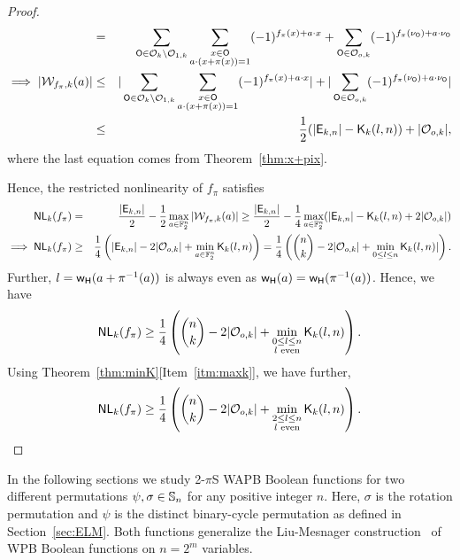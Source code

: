 \documentclass{llncs}
\begin{document}
\begin{proof}
\begin{eqnarray*}
& =  & \sum_{\mathsf{O} \in \mathcal{O}_k\setminus \mathcal{O}_{1,k}} \sum_{\substack{x \in \mathsf{O} \\ a \cdot (x + \pi(x))= 1}} (-1)^{f_\pi(x)+ a \cdot x} + \sum_{\mathsf{O} \in \mathcal{O}_{o,k}} (-1)^{ f_\pi(\nu_{\mathsf{O}}) + a \cdot \nu_{\mathsf{O}}}\nonumber \\
\implies |\mathcal{W}_{f_\pi,k}(a)| & \leq & |\sum_{\mathsf{O} \in \mathcal{O}_k\setminus \mathcal{O}_{1,k}} \sum_{\substack{x \in \mathsf{O} \\ a \cdot (x + \pi(x))= 1}} (-1)^{f_\pi(x)+ a \cdot x}| + |\sum_{\mathsf{O} \in \mathcal{O}_{o,k}} (-1)^{ f_\pi(\nu_{\mathsf{O}}) + a \cdot \nu_{\mathsf{O}}}|\nonumber \\
& \leq & \frac{1}{2} (|\mathsf{E}_{k,n}| - \mathsf{K}_{k}(l,n)) + |\mathcal{O}_{o,k}|,
\end{eqnarray*}
where the last equation comes from Theorem~\ref{thm:x+pix}.

Hence, the restricted nonlinearity of $f_\pi$ satisfies
\begin{eqnarray*}
\mathsf{NL}_{k}(f_\pi) & = & \frac{|\mathsf{E}_{k,n}|}{2} -\frac{1}{2} \max_{a\in \mathbb{F}_2^n}| \mathcal{W}_{f_\pi,k}(a)| \geq \frac{|\mathsf{E}_{k,n}|}{2} - \frac{1}{4}\max_{a\in \mathbb{F}_2^n} (|\mathsf{E}_{k,n}| - \mathsf{K}_{k}(l,n) + 2|\mathcal{O}_{o,k}|) \\
\implies \mathsf{NL}_{k}(f_\pi) & \geq & \frac{1}{4}\left(|\mathsf{E}_{k,n}|  - 2|\mathcal{O}_{o,k}| + \min_{a\in \mathbb{F}_2^n} \mathsf{K}_{k}(l,n)\right)
= \frac{1}{4}\left({n \choose k}  - 2|\mathcal{O}_{o,k}| + \min_{0 \leq l \leq n} \mathsf{K}_{k}(l,n)|\right).
\end{eqnarray*}
Further, $l = \mathsf{w_H}(a+\pi^{-1}(a))$ is always even as $\mathsf{w_H}(a) = \mathsf{w_H}(\pi^{-1}(a))$. Hence, we have
$$\mathsf{NL}_{k}(f_\pi) \geq \frac{1}{4}\left({n \choose k} - 2|\mathcal{O}_{o,k}| + \min_{\substack{0 \leq l \leq n \\ l \text{ even}}} \mathsf{K}_{k}(l,n)\right).$$
Using Theorem~\ref{thm:minK}[Item~\ref{itm:maxk}], we have further,
$$\mathsf{NL}_{k}(f_\pi) \geq \frac{1}{4}\left({n \choose k} - 2|\mathcal{O}_{o,k}| + \min_{\substack{2 \leq l \leq n \\ l \text{ even}}} \mathsf{K}_{k}(l,n)\right).$$
\end{proof}

In the following sections we study 2-$\pi$S WAPB Boolean functions for two different permutations $\psi, \sigma \in \mathbb{S}_n$ for any positive integer $n$.
Here, $\sigma$ is the rotation permutation and $\psi$ is the distinct binary-cycle permutation as defined in Section~\ref{sec:ELM}. 
Both functions generalize the Liu-Mesnager construction~\cite{DCC:LiuMes19} of WPB Boolean functions on $n = 2^m$ variables.
\end{document}
